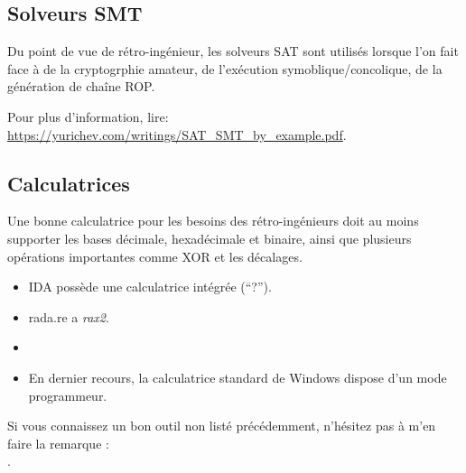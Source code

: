 \subsection{Solveurs SMT}

Du point de vue de rétro-ingénieur, les solveurs SAT sont utilisés lorsque l'on
fait face à de la cryptogrphie amateur, de l'exécution symoblique/concolique,
de la génération de chaîne ROP.

Pour plus d'information, lire: \url{https://yurichev.com/writings/SAT_SMT_by_example.pdf}.

\subsection{Calculatrices}

Une bonne calculatrice pour les besoins des rétro-ingénieurs doit au moins supporter
les bases décimale, hexadécimale et binaire, ainsi que plusieurs opérations importantes
comme XOR et les décalages.

\begin{itemize}

\item IDA possède une calculatrice intégrée (``?'').

\item rada.re a \emph{rax2}.

\item \ProgCalcURL

\item En dernier recours, la calculatrice standard de Windows dispose d'un mode
programmeur.

\end{itemize}


Si vous connaissez un bon outil non listé précédemment, n'hésitez pas à m'en faire la remarque : \\
\TT{\EMAILS}.

